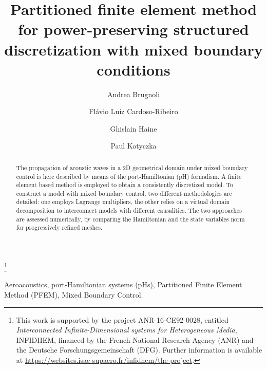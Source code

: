 \documentclass{ifacconf}
\begin{document}
\begin{frontmatter}

\title{Partitioned finite element method for power-preserving structured discretization with mixed boundary conditions} 

\thanks[footnoteinfo]{This work is  supported by the project ANR-16-CE92-0028,
	entitled {\em Interconnected Infinite-Dimensional systems for Heterogeneous
		Media}, INFIDHEM, financed by the French National
	Research Agency (ANR) and the Deutsche Forschungsgemeinschaft (DFG). Further information is available at {\url{https://websites.isae-supaero.fr/infidhem/the-project}}.}

\author[ISAE]{Andrea Brugnoli} 
\author[ITA]{Fl\'avio Luiz Cardoso-Ribeiro} 
\author[ISAE]{Ghislain Haine}
\author[TUM]{Paul Kotyczka}

\address[ISAE]{ISAE-SUPAERO, Universit\'e de Toulouse,
	10 Avenue Edouard Belin, BP-54032, 31055 Toulouse Cedex 4, France
	(e-mail: \{andrea.brugnoli, ghislain.haine\}@isae.fr).}
\address[ITA]{Instituto Tecnol\'ogico de Aeron\'autica, Brazil (e-mail:flaviocr@ita.br).}
\address[TUM]{Chair of Automatic Control, Technical University of Munich, 85748 Garching, Germany (e-mail:kotyczka@tum.de).}

\begin{abstract}                %
The propagation of acoustic waves in a 2D geometrical domain under mixed boundary control is here described by means of the port-Hamiltonian (pH) formalism. A finite element based method is employed to obtain a consistently discretized model. To construct a model with mixed boundary control, two different methodologies are detailed: one employs Lagrange multipliers, the other relies on a virtual domain decomposition to interconnect models with different causalities. The two approaches are assessed numerically, by comparing the Hamiltonian and the state variables norm for progressively refined meshes.
\end{abstract}

\begin{keyword}
Aeroacoustics, port-Hamiltonian systems (pHs), Partitioned Finite Element Method (PFEM), Mixed Boundary Control.
\end{keyword}

\end{frontmatter}
\end{document}
